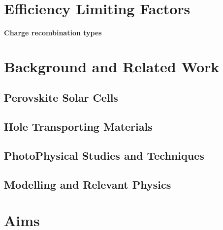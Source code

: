 \section{Efficiency Limiting Factors}

\paragraph{Charge recombination types}

\section{Background and Related Work}\label{sec:background}

\subsection{Perovskite Solar Cells}

\subsection{Hole Transporting Materials}

\subsection{PhotoPhysical Studies and Techniques}

\subsection{Modelling and Relevant Physics}


\section{Aims}